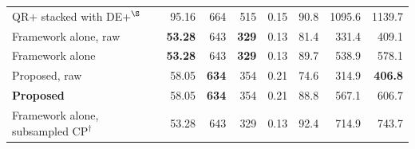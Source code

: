 \begin{table}[!tbp]
\begin{tabular}{lrrrrrrr}
QR+ stacked with DE+$^\S$ & 95.16 & 664 & 515 & 0.15 & 90.8 & 1095.6 & 1139.7\\
Framework alone, raw & \textbf{53.28} & 643 & \textbf{329} & 0.13 & 81.4 & 331.4 & 409.1\\
Framework alone & \textbf{53.28} & 643 & \textbf{329} & 0.13 & 89.7 & 538.9 & 578.1\\
Proposed, raw & 58.05 & \textbf{634} & 354 & 0.21 & 74.6 & 314.9 & \textbf{406.8}\\
\textbf{Proposed} & 58.05 & \textbf{634} & 354 & 0.21 & 88.8 & 567.1 & 606.7\\
Framework alone, subsampled CP$^\dagger$ & 53.28 & 643 & 329 & 0.13 & 92.4 & 714.9 & 743.7\\
\bottomrule
\end{tabular}
\end{table}